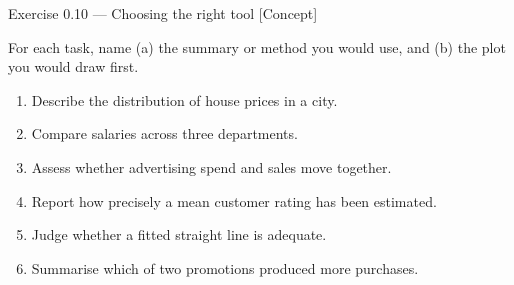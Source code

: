 \documentclass[aspectratio=169,11pt]{beamer}
\begin{document}
\begin{frame}{Exercise 0.10 --- Choosing the right tool [Concept]}
  \begin{exercise}
    For each task, name (a) the summary or method you would use, and (b) the
    plot you would draw first.
    \begin{enumerate}
      \item Describe the distribution of house prices in a city.
      \item Compare salaries across three departments.
      \item Assess whether advertising spend and sales move together.
      \item Report how precisely a mean customer rating has been estimated.
      \item Judge whether a fitted straight line is adequate.
      \item Summarise which of two promotions produced more purchases.
    \end{enumerate}
  \end{exercise}
\end{frame}
\end{document}
